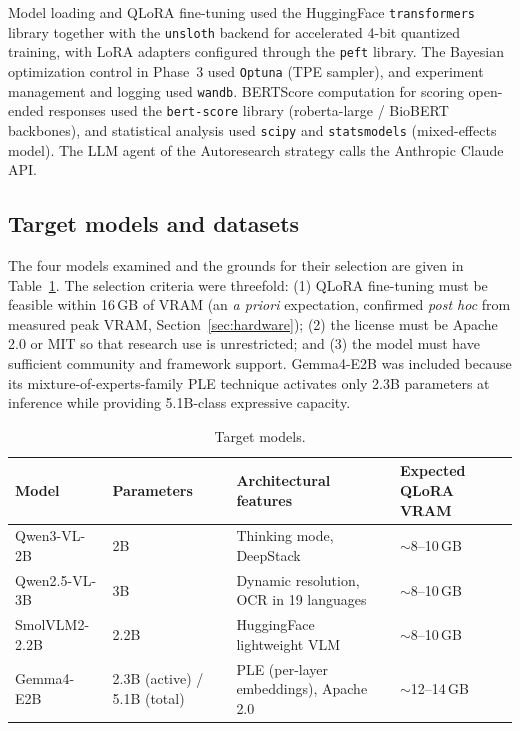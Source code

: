 Model loading and QLoRA fine-tuning used the HuggingFace \texttt{transformers}
library together with the \texttt{unsloth} backend for accelerated 4-bit
quantized training, with LoRA adapters configured through the \texttt{peft}
library. The Bayesian optimization control in Phase~3 used \texttt{Optuna} (TPE
sampler), and experiment management and logging used \texttt{wandb}. BERTScore
computation for scoring open-ended responses used the \texttt{bert-score} library
(roberta-large / BioBERT backbones), and statistical analysis used \texttt{scipy}
and \texttt{statsmodels} (mixed-effects model). The LLM agent of the Autoresearch
strategy calls the Anthropic Claude API.

\subsection{Target models and datasets}
\label{sec:models}

The four models examined and the grounds for their selection are given in
Table~\ref{tab:models}. The selection criteria were threefold: (1) QLoRA
fine-tuning must be feasible within 16\,GB of VRAM (an \emph{a priori}
expectation, confirmed \emph{post hoc} from measured peak VRAM,
Section~\ref{sec:hardware}); (2) the license must be Apache 2.0 or MIT so that
research use is unrestricted; and (3) the model must have sufficient community and
framework support. Gemma4-E2B was included because its mixture-of-experts-family
PLE technique activates only 2.3B parameters at inference while providing
5.1B-class expressive capacity.

\begin{table}[t]
\centering
\caption{Target models.}
\label{tab:models}
\small
\begin{tabular}{@{}llll@{}}
\toprule
Model & Parameters & Architectural features & Expected QLoRA VRAM \\
\midrule
Qwen3-VL-2B    & 2B   & Thinking mode, DeepStack             & $\sim$8--10\,GB \\
Qwen2.5-VL-3B  & 3B   & Dynamic resolution, OCR in 19 languages & $\sim$8--10\,GB \\
SmolVLM2-2.2B  & 2.2B & HuggingFace lightweight VLM          & $\sim$8--10\,GB \\
Gemma4-E2B     & 2.3B (active) / 5.1B (total) & PLE (per-layer embeddings), Apache 2.0 & $\sim$12--14\,GB \\
\bottomrule
\end{tabular}
\end{table}

